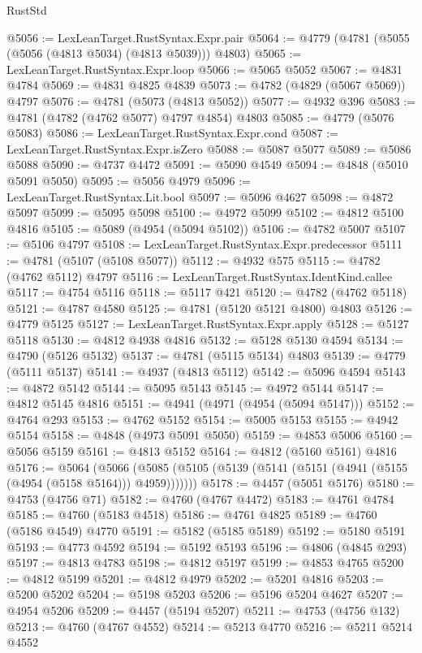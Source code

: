\begin{lexlean}{RustStd}
\begin{coremodule}
@5056 := LexLeanTarget.RustSyntax.Expr.pair
@5064 := @4779 (@4781 (@5055 (@5056 (@4813 @5034) (@4813 @5039))) @4803)
@5065 := LexLeanTarget.RustSyntax.Expr.loop
@5066 := @5065 @5052
@5067 := @4831 @4784
@5069 := @4831 @4825 @4839
@5073 := @4782 (@4829 (@5067 @5069)) @4797
@5076 := @4781 (@5073 (@4813 @5052))
@5077 := @4932 @396
@5083 := @4781 (@4782 (@4762 @5077) @4797 @4854) @4803
@5085 := @4779 (@5076 @5083)
@5086 := LexLeanTarget.RustSyntax.Expr.cond
@5087 := LexLeanTarget.RustSyntax.Expr.isZero
@5088 := @5087 @5077
@5089 := @5086 @5088
@5090 := @4737 @4472
@5091 := @5090 @4549
@5094 := @4848 (@5010 @5091 @5050)
@5095 := @5056 @4979
@5096 := LexLeanTarget.RustSyntax.Lit.bool
@5097 := @5096 @4627
@5098 := @4872 @5097
@5099 := @5095 @5098
@5100 := @4972 @5099
@5102 := @4812 @5100 @4816
@5105 := @5089 (@4954 (@5094 @5102))
@5106 := @4782 @5007
@5107 := @5106 @4797
@5108 := LexLeanTarget.RustSyntax.Expr.predecessor
@5111 := @4781 (@5107 (@5108 @5077))
@5112 := @4932 @575
@5115 := @4782 (@4762 @5112) @4797
@5116 := LexLeanTarget.RustSyntax.IdentKind.callee
@5117 := @4754 @5116
@5118 := @5117 @421
@5120 := @4782 (@4762 @5118)
@5121 := @4787 @4580
@5125 := @4781 (@5120 @5121 @4800) @4803
@5126 := @4779 @5125
@5127 := LexLeanTarget.RustSyntax.Expr.apply
@5128 := @5127 @5118
@5130 := @4812 @4938 @4816
@5132 := @5128 @5130 @4594
@5134 := @4790 (@5126 @5132)
@5137 := @4781 (@5115 @5134) @4803
@5139 := @4779 (@5111 @5137)
@5141 := @4937 (@4813 @5112)
@5142 := @5096 @4594
@5143 := @4872 @5142
@5144 := @5095 @5143
@5145 := @4972 @5144
@5147 := @4812 @5145 @4816
@5151 := @4941 (@4971 (@4954 (@5094 @5147)))
@5152 := @4764 @293
@5153 := @4762 @5152
@5154 := @5005 @5153
@5155 := @4942 @5154
@5158 := @4848 (@4973 @5091 @5050)
@5159 := @4853 @5006
@5160 := @5056 @5159
@5161 := @4813 @5152
@5164 := @4812 (@5160 @5161) @4816
@5176 := @5064
    (@5066 (@5085 (@5105 (@5139 (@5141 (@5151 (@4941 (@5155 (@4954 (@5158 @5164))) @4959)))))))
@5178 := @4457 (@5051 @5176)
@5180 := @4753 (@4756 @71)
@5182 := @4760 (@4767 @4472)
@5183 := @4761 @4784
@5185 := @4760 (@5183 @4518)
@5186 := @4761 @4825
@5189 := @4760 (@5186 @4549) @4770
@5191 := @5182 (@5185 @5189)
@5192 := @5180 @5191
@5193 := @4773 @4592
@5194 := @5192 @5193
@5196 := @4806 (@4845 @293)
@5197 := @4813 @4783
@5198 := @4812 @5197
@5199 := @4853 @4765
@5200 := @4812 @5199
@5201 := @4812 @4979
@5202 := @5201 @4816
@5203 := @5200 @5202
@5204 := @5198 @5203
@5206 := @5196 @5204 @4627
@5207 := @4954 @5206
@5209 := @4457 (@5194 @5207)
@5211 := @4753 (@4756 @132)
@5213 := @4760 (@4767 @4552)
@5214 := @5213 @4770
@5216 := @5211 @5214 @4552

\end{coremodule}
\end{lexlean}
